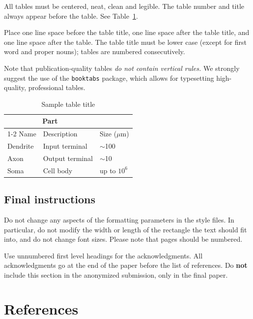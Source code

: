 \documentclass{article}
\begin{document}
All tables must be centered, neat, clean and legible. The table number and
title always appear before the table. See Table~\ref{sample-table}.

Place one line space before the table title, one line space after the
table title, and one line space after the table. The table title must
be lower case (except for first word and proper nouns); tables are
numbered consecutively.

Note that publication-quality tables \emph{do not contain vertical rules.} We
strongly suggest the use of the \verb+booktabs+ package, which allows for
typesetting high-quality, professional tables.


\begin{table}
  \caption{Sample table title}
  \label{sample-table}
  \centering
  \begin{tabular}{lll}
    \toprule
    \multicolumn{2}{c}{Part}                   \\
    \cmidrule(r){1-2}
    Name     & Description     & Size ($\mu$m) \\
    \midrule
    Dendrite & Input terminal  & $\sim$100     \\
    Axon     & Output terminal & $\sim$10      \\
    Soma     & Cell body       & up to $10^6$  \\
    \bottomrule
  \end{tabular}
\end{table}


\subsection{Final instructions}


Do not change any aspects of the formatting parameters in the style files. In
particular, do not modify the width or length of the rectangle the text should
fit into, and do not change font sizes. Please note that pages should be
numbered.


\begin{ack}
Use unnumbered first level headings for the acknowledgments. All acknowledgments
go at the end of the paper before the list of references.
Do {\bf not} include this section in the anonymized submission, only in the
final paper.
\end{ack}


\section*{References}
\end{document}
